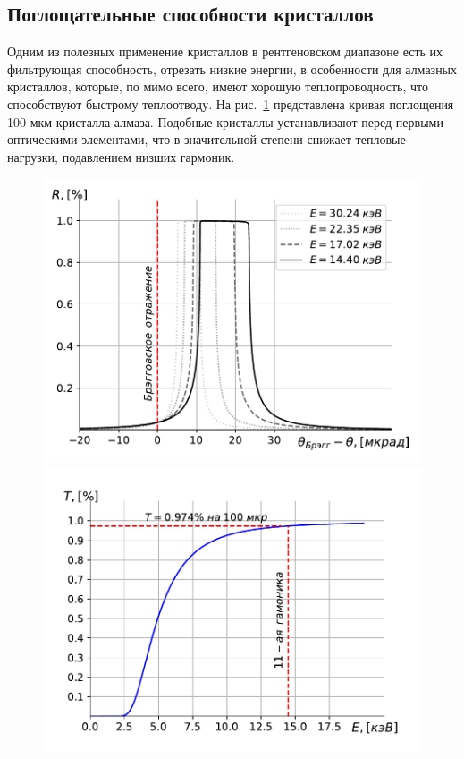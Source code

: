 \documentclass[14pt,a4paper]{extarticle}
\numberwithin{equation}{section}
\begin{document}
\subsection{Поглощательные способности кристаллов}
Одним из полезных применение кристаллов в рентгеновском диапазоне есть их фильтрующая способность, отрезать низкие энергии, в особенности для алмазных кристаллов, которые, по мимо всего, имеют хорошую теплопроводность, что способствуют быстрому теплоотводу. На рис.~\ref{fig:bragg_T} представлена кривая поглощения 100 мкм кристалла алмаза. Подобные кристаллы устанавливают перед первыми оптическими элементами, что в значительной степени снижает тепловые нагрузки, подавлением низших гармоник.
\begin{figure}
	\centering  
	\begin{minipage}{0.49\textwidth}
		\centering
		\includegraphics[width=\textwidth]{pic/bragg_R.pdf}
		\caption{}
		\label{fig:bragg_R}
	\end{minipage}\hfill
	\begin{minipage}{0.49\textwidth}
		\centering
		\includegraphics[width=\textwidth]{pic/bragg_T.pdf}
		\caption{}
		\label{fig:bragg_T}
	\end{minipage}    
\end{figure}
\end{document}
